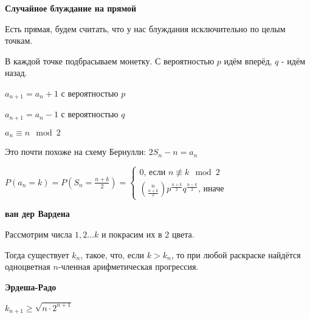 \begin{example}
    \textbf{Случайное блуждание на прямой}

    Есть прямая, будем считать, что у нас блуждания исключительно по целым точкам.

    В каждой точке подбрасываем монетку. С вероятностью $p$ идём вперёд, $q$ - идём назад.

    $a_{n + 1} = a_{n} + 1$ с вероятностью $p$

    $a_{n + 1} = a_{n} - 1$ с вероятностью $q$

    $a_n \equiv n \mod 2$

    Это почти похоже на схему Бернулли: $2S_n - n = a_n$

    $P(a_n = k) = P(S_n = \frac{n + k}{2}) = \begin{cases}
        0 \text{, если } n \not \equiv k \mod 2 \\
        \binom{n}{\frac{n + k}{2}} p^{\frac{n + k}{2}} q^{\frac{n - k}{2}} \text{, иначе}
    \end{cases}$
\end{example}

\begin{theorem}
    \textbf{ван дер Вардена}

    Рассмотрим числа $1, 2 \ldots k$ и покрасим их в 2 цвета. 

    Тогда существует $k_n$, такое, что, если $k > k_n$, то при любой раскраске
    найдётся одноцветная $n$-членная арифметическая прогрессия.
\end{theorem}

\begin{theorem}
    \textbf{Эрдеша-Радо}

    $k_{n + 1} \geqslant \sqrt{n \cdot 2^{n + 1}}$
\end{theorem}

